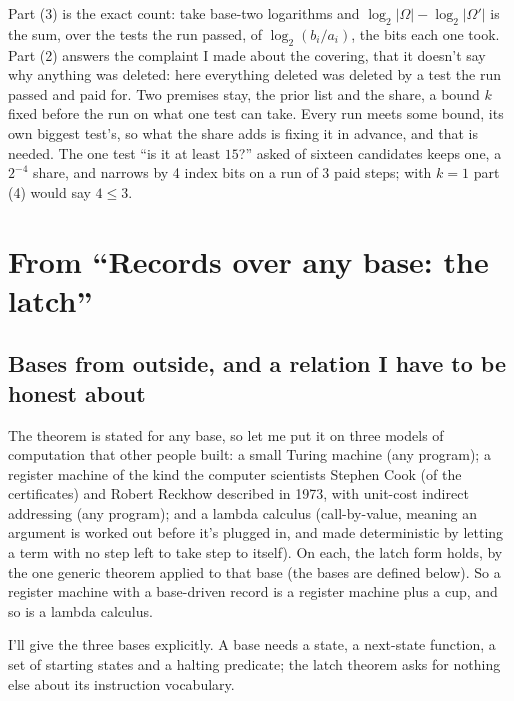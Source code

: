 \documentclass[11pt,twoside]{article}
\theoremstyle{thielethm}
\theoremstyle{thieledef}
\theoremstyle{thieledef}
\theoremstyle{thieledef}
\theoremstyle{thielethm}
\theoremstyle{thieleobs}
\theoremstyle{thielethm}
\begin{document}
Part (3) is the exact count: take
base-two logarithms and $\log_2 |\Omega| - \log_2 |\Omega'|$ is the sum, over the tests the run
passed, of $\log_2 (b_i / a_i)$, the bits each one took. Part (2) answers the complaint I made
about the covering, that it doesn't say why anything was deleted: here everything deleted was
deleted by a test the run passed and paid for. Two premises stay, the prior list and the share, a bound $k$ fixed before the run on what one test can take. Every run meets some bound, its own biggest test's, so what the share adds is fixing it in advance, and that is needed. The one test ``is it at least $15$?'' asked of sixteen
candidates keeps one, a $2^{-4}$ share, and narrows by 4 index bits on a run of 3 paid steps;
with $k = 1$ part (4) would say $4 \le 3$.


\section{From ``Records over any base: the latch''}
\subsection{Bases from outside, and a relation I have to be honest about}

The theorem is stated for any base, so let me put it on three models of computation that other
people built: a small Turing machine (any program); a register machine
of the kind the computer scientists Stephen Cook (of the certificates) and Robert Reckhow described in 1973, with unit-cost indirect addressing (any
program); and a lambda calculus (call-by-value, meaning an argument is worked out before it's
plugged in, and made deterministic by letting a term with no step left to take step to
itself). On each, the latch form holds, by the one generic theorem applied to that base
(the bases are defined below). So a register machine
with a base-driven record is a register machine plus a cup, and so is a lambda calculus.

I'll give the three bases explicitly. A base needs a state, a next-state function,
a set of starting states and a halting predicate; the latch theorem asks for nothing
else about its instruction vocabulary.
\end{document}
